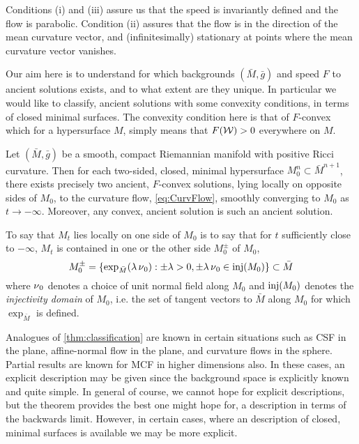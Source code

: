 \documentclass{amsart}
\begin{document}
Conditions (i) and (iii) assure us that the speed is invariantly defined and the flow is parabolic. Condition (ii) assures that the flow is in the direction of the mean curvature vector, and (infinitesimally) stationary at points where the mean curvature vector vanishes.

Our aim here is to understand for which backgrounds \((\bar{M}, \bar{g})\) and speed \(F\) to ancient solutions exists, and to what extent are they unique. In particular we would like to classify, ancient solutions with some convexity conditions, in terms of closed minimal surfaces. The convexity condition here is that of \(F\)-convex which for a hypersurface \(M\), simply means that \(F(\operatorname{\mathcal{W}}) > 0\) everywhere on \(M\).

\begin{thm}
\label{thm:classification}
Let \((\bar{M}, \bar{g})\) be a smooth, compact Riemannian manifold with positive Ricci curvature. Then for each two-sided, closed, minimal hypersurface \(M_0^n \subset \bar{M}^{n+1}\), there exists precisely two ancient, \(F\)-convex solutions, lying locally on opposite sides of \(M_0\), to the curvature flow, \eqref{eq:CurvFlow}, smoothly converging to \(M_0\) as \(t \to -\infty\). Moreover, any convex, ancient solution is such an ancient solution.
\end{thm}

\begin{rem}
To say that \(M_t\) lies locally on one side of \(M_0\) is to say that for \(t\) sufficiently close to \(-\infty\), \(M_t\) is contained in one or the other side \(M_0^{\pm}\) of \(M_0\),
\[
M_0^{\pm} = \{\exp_{\bar{M}} (\lambda \operatorname{\nu}_0) : \pm \lambda > 0, \pm \lambda \operatorname{\nu}_0 \in \operatorname{inj}(M_0)\} \subset \bar{M}
\]
where \(\operatorname{\nu}_0\) denotes a choice of unit normal field along \(M_0\) and \(\operatorname{inj}(M_0)\) denotes the \emph{injectivity domain} of \(M_0\), i.e. the set of tangent vectors to \(\bar{M}\) along \(M_0\) for which \(\exp_{\bar{M}}\) is defined.
\end{rem}

Analogues of \cref{thm:classification} are known in certain situations such as CSF in the plane, affine-normal flow in the plane, and curvature flows in the sphere. Partial results are known for MCF in higher dimensions also. In these cases, an explicit description may be given since the background space is explicitly known and quite simple. In general of course, we cannot hope for explicit descriptions, but the theorem provides the best one might hope for, a description in terms of the backwards limit. However, in certain cases, where an description of closed, minimal surfaces is available we may be more explicit.
\end{document}
